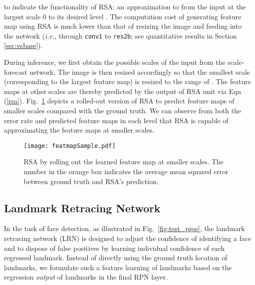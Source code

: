 \documentclass[10pt,twocolumn,letterpaper]{article}
\begin{document}
to indicate the functionality of RSA: an approximation to  from the input at the largest scale 0 to its desired level .
The computation cost of generating  feature map  using RSA is much lower than that of resizing the image and feeding into the network (\textit{i.e.},   through \texttt{conv1} to \texttt{res2b}; see quantitative results in Section \ref{sec:vsbase}).

During inference, we first obtain the possible scales of the input from the scale-forecast network.
The image is then resized accordingly so that the smallest scale (corresponding to the largest feature map) is resized to the range of . The feature maps at other scales are thereby predicted by the output of RSA unit via Eqn (\ref{rsa}).
Fig.~\ref{RSA_sample} depicts a rolled-out version of RSA to predict feature maps of smaller scales compared with the ground truth. We can observe  from both the error rate and predicted feature maps in each level that RSA is capable of approximating the feature maps at smaller scales.
\begin{figure}[h]
	\begin{center}
		\texttt{[image: featmapSample.pdf]}
	\end{center}
	\caption{RSA by rolling out the learned feature map at smaller scales. The number in the orange box indicates the average mean squared error between ground truth and RSA's prediction.}
	\label{RSA_sample}
	\vspace{-.3cm}
\end{figure}


\subsection{Landmark Retracing  Network}\label{sec:landmark-retracing--network}

In the task of face detection, as illustrated in Fig.~\ref{fig:test_pipe}, the landmark retracing network (LRN) is designed to adjust the confidence  of identifying a face and to dispose of false positives by learning  individual confidence of each regressed landmark. Instead of directly using the ground truth location of landmarks, we formulate such a feature learning of landmarks based on the regression \textit{output} of landmarks in the final RPN layer.
\end{document}
